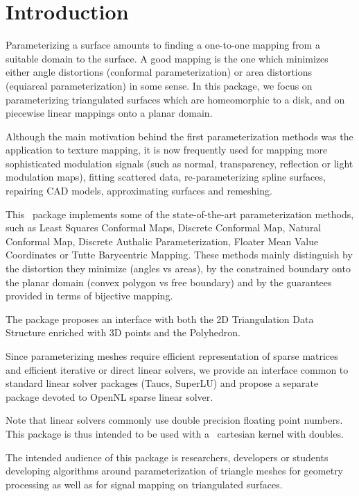 \section{Introduction}

Parameterizing a surface amounts to finding a one-to-one mapping from
a suitable domain to the surface. A good mapping is the one which
minimizes either angle distortions (conformal parameterization) or
area distortions (equiareal parameterization) in some sense.  In this
package, we focus on parameterizing triangulated surfaces which are
homeomorphic to a disk, and on piecewise linear mappings onto a planar
domain.

Although the main motivation behind the first parameterization methods
was the application to texture mapping, it is now frequently used for
mapping more sophisticated modulation signals (such as normal,
transparency, reflection or light modulation maps), fitting scattered
data, re-parameterizing spline surfaces, repairing CAD models,
approximating surfaces and remeshing.

This \cgal\ package implements some of the state-of-the-art
parameterization methods, such as Least Squares Conformal Maps,
Discrete Conformal Map, Natural Conformal Map, Discrete Authalic
Parameterization, Floater Mean Value Coordinates or Tutte Barycentric
Mapping. These methods mainly distinguish by the distortion they
minimize (angles vs areas), by the constrained boundary onto the
planar domain (convex polygon vs free boundary) and by the guarantees
provided in terms of bijective mapping.

The package proposes an interface with both the 2D Triangulation Data
Structure enriched with 3D points and the Polyhedron.

Since parameterizing meshes require efficient representation of sparse
matrices and efficient iterative or direct linear solvers, we provide
an interface common to standard linear solver packages ({\sc Taucs},
SuperLU) and propose a separate package devoted to OpenNL sparse
linear solver.

Note that linear solvers commonly use double precision floating point
numbers. This package is thus intended to be used with a \cgal\
cartesian kernel with doubles.

The intended audience of this package is researchers, developers or
students developing algorithms around parameterization of triangle
meshes for geometry processing as well as for signal mapping on
triangulated surfaces.

